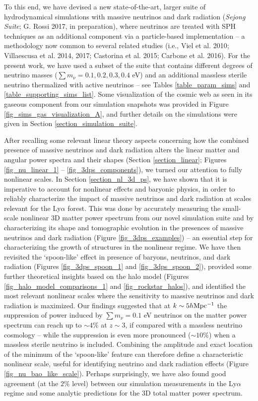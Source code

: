 \documentclass{emulateapj}
\begin{document}
To this end, we have devised a 
new state-of-the-art, larger suite of hydrodynamical simulations 
with massive neutrinos and dark radiation (\textit{Sejong Suite}; G. Rossi 2017, in preparation), where
neutrinos are treated with  
SPH techniques as an additional component 
via a particle-based implementation -- a 
methodology now common to several related studies 
(i.e., Viel et al. 2010; Villaescusa et al. 2014, 2017; Castorina et al. 2015; Carbone et al. 2016). 
For the present work, we have used a subset of the suite 
that contains different degrees of neutrino masses ($\sum m_{\nu} =0.1, 0.2, 0.3, 0.4 $ eV)
and an additional massless sterile neutrino thermalized with active neutrinos  -- see Tables \ref{table_param_sims} and \ref{table_supporting_sims_list}.  
Some visualization of the cosmic web as seen in its gaseous component from our simulation snapshots was provided in 
Figure \ref{fig_sims_gas_visualization_A}, and further details on the simulations were given in
Section \ref{section_simulation_suite}.  

After recalling some relevant linear theory aspects  
concerning how the combined presence of massive neutrinos and dark radiation alters the linear matter and angular power spectra and their 
shapes
(Section \ref{section_linear}; Figures \ref{fig_nu_linear_1} -- \ref{fig_3dps_components}), we turned
our attention to fully nonlinear scales. 
In Section \ref{section_nl_3d_ps}, we have shown that it is
imperative to account for 
  nonlinear effects and baryonic physics, in order to reliably   
characterize the impact of massive neutrinos and dark radiation at scales relevant for the Ly$\alpha$ forest.
This was done by accurately 
measuring the small-scale  nonlinear 3D matter power spectrum
 from our novel simulation suite and by
characterizing  its shape and tomographic evolution in the presences of massive neutrinos and dark radiation  (Figure \ref{fig_3dps_examples})
-- an essential step for characterizing the growth of structures in the nonlinear regime.  
We have then 
revisited the `spoon-like' effect  in presence of baryons, neutrinos, and dark radiation (Figures \ref{fig_3dps_spoon_1} and \ref{fig_3dps_spoon_2}), 
provided some further theoretical insights based on the halo model  (Figures \ref{fig_halo_model_comparisons_1} and \ref{fig_rockstar_halos}), and 
identified  the most relevant nonlinear scales where the 
sensitivity to massive neutrinos and dark radiation is maximized.
Our findings suggested that 
 at  $k \sim 5h{\rm Mpc^{-1}}$ the suppression of power induced by $\sum m_{\nu}=0.1$ eV  neutrinos  
on the matter power spectrum can reach up to $\sim 4\%$  at $z\sim 3$, if compared with a massless neutrino cosmology -- while  the suppression is even more
pronounced ($\sim 10\%$) when a massless sterile neutrino is included. 
Combining  the amplitude and exact location of the minimum of the
`spoon-like' feature can therefore define  
a characteristic nonlinear scale, useful for identifying neutrino and dark radiation effects (Figure \ref{fig_nu_bao_like_scale}).
Perhaps surprisingly,  we have also found  
good agreement (at the $2\%$ level)  between our simulation measurements in the Ly$\alpha$ regime and some analytic 
predictions for the 3D total matter power spectrum. 
 
\end{document}
